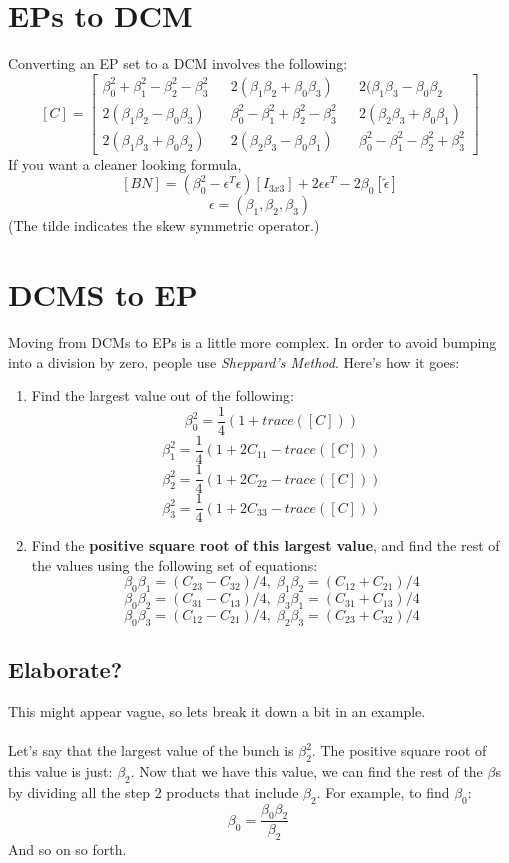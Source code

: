 \documentclass[a4paper,14pt]{extreport}
\begin{document}
\section{EPs to DCM}
Converting an EP set to a DCM involves the following:
\[
[C] = 
\begin{bmatrix}
\beta_0^2+\beta_1^2-\beta_2^2-\beta_3^2&&2(\beta_1\beta_2+\beta_0\beta_3)&&2(\beta_1\beta_3-\beta_0\beta_2\\
2(\beta_1\beta_2-\beta_0\beta_3)&&\beta_0^2-\beta_1^2+\beta_2^2-\beta_3^2&&2(\beta_2\beta_3+\beta_0\beta_1)\\2(\beta_1\beta_3+\beta_0\beta_2)&&2(\beta_2\beta_3-\beta_0\beta_1)&&\beta_0^2-\beta_1^2-\beta_2^2+\beta_3^2
\end{bmatrix}
\]
If you want a cleaner looking formula,
\[
[BN] = (\beta_0^2 - \epsilon^T\epsilon)[I_{3x3}]+2\epsilon\epsilon^T-2\beta_0[\tilde{\epsilon}]
\]
\[
\epsilon = (\beta_1,\beta_2,\beta_3)
\]
(The tilde indicates the skew symmetric operator.)
\section{DCMS to EP}
Moving from DCMs to EPs is a little more complex. In order to avoid bumping into a division by zero, people use \emph{Sheppard's Method}. Here's how it goes:
\begin{enumerate}
\item{Find the largest value out of the following:\\
\[
\beta_0^2 = \dfrac{1}{4}(1+trace([C]))
\]
\[
\beta_1^2 = \dfrac{1}{4}(1+2C_{11}-trace([C]))
\]
\[
\beta_2^2 = \dfrac{1}{4}(1+2C_{22}-trace([C]))
\]
\[
\beta_3^2 = \dfrac{1}{4}(1+2C_{33}-trace([C]))
\]}
\item{Find the \textbf{positive square root of this largest value}, and find the rest of the values using the following set of equations:\\
\[\beta_0\beta_1=(C_{23}-C_{32})/4,\;\beta_1\beta_2=(C_{12}+C_{21})/4\]
\[\beta_0\beta_2=(C_{31}-C_{13})/4,\;\beta_3\beta_1=(C_{31}+C_{13})/4\]
\[\beta_0\beta_3=(C_{12}-C_{21})/4,\;\beta_2\beta_3=(C_{23}+C_{32})/4\]
}
\end{enumerate}

\subsection{Elaborate?}
This might appear vague, so lets break it down a bit in an example.\\\\Let's say that the largest value of the bunch is 
\(\beta_2^2\). The positive square root of this value is just: \(\beta_2\). Now that we have this value, we can find the rest of the $\beta$s by dividing all the step 2 products that include $\beta_2$. For example, to find $\beta_0$:
\[
\beta_0=\dfrac{\beta_0\beta_2}{\beta_2}\
\]
And so on so forth.
\end{document}
